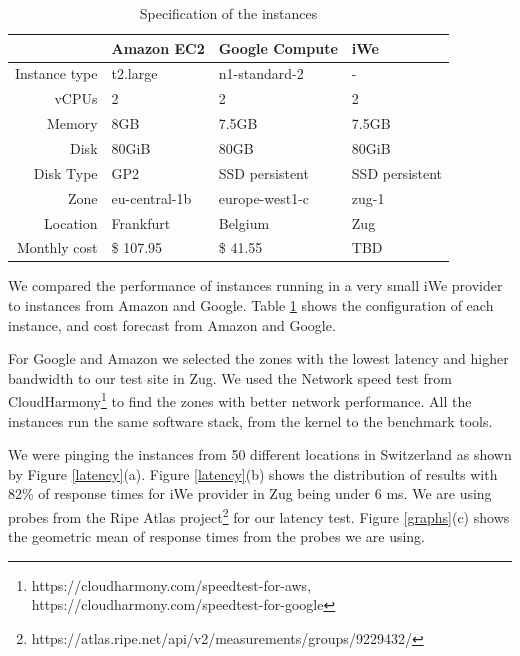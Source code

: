 \begin{table}
    \centering
    \begin{tabular}{r l l l}
                                    & Amazon EC2     & Google Compute & iWe \\
        \hline
        Instance type               &  t2.large & n1-standard-2 & - \\
        \hline

        vCPUs                       &  2 & 2 & 2 \\
        \hline

        Memory                      & 8GB & 7.5GB & 7.5GB \\
        \hline

        Disk                        & 80GiB & 80GB &  80GiB \\
        \hline

        Disk Type                   & GP2 & SSD persistent & SSD persistent \\
        \hline

        Zone                        & eu-central-1b & europe-west1-c & zug-1 \\
        \hline

        Location                    & Frankfurt & Belgium & Zug \\
        \hline

        Monthly cost                & \$ 107.95 & \$ 41.55 & TBD \\
        \hline
    \end{tabular}
    \caption{Specification of the instances}
    \label{table:instances}
\end{table}

We compared the performance of instances running in a very small iWe
provider to instances from Amazon and Google. Table \ref{table:instances} shows
the configuration of each instance, and cost forecast from Amazon and Google.

For Google and Amazon we selected the zones with the lowest latency and higher
bandwidth to our test site in Zug. We used the Network speed test from
CloudHarmony\footnote{https://cloudharmony.com/speedtest-for-aws,
https://cloudharmony.com/speedtest-for-google} to find the zones with better
network performance. All the instances run the same software stack, from the
kernel to the benchmark tools.

We were pinging the instances from 50 different locations in Switzerland as
shown by Figure \ref{latency}(a). Figure \ref{latency}(b) shows the distribution
of results with 82\% of response times for iWe provider in Zug being under 6 ms.
We are using probes from the Ripe Atlas
project\footnote{https://atlas.ripe.net/api/v2/measurements/groups/9229432/} for
our latency test. Figure \ref{graphs}(c) shows the geometric mean of response
times from the probes we are using.

